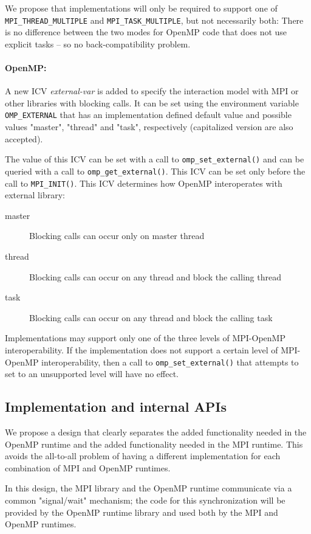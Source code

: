 We propose that implementations will only be required to support one of 
\texttt{MPI\_THREAD\_MULTIPLE} and \texttt{MPI\_TASK\_MULTIPLE}, but not 
necessarily both: There is no difference between the two modes for OpenMP code 
that does not use explicit tasks -- so no back-compatibility problem. 


\paragraph{OpenMP:}
A new ICV \emph{external-var} is added to specify the interaction model with 
MPI or other libraries with blocking calls.
It can be set using the environment variable \texttt{OMP\_EXTERNAL} that has 
an implementation defined default 
 value and possible values  "master", 
"thread" and "task", respectively (capitalized version are 
also accepted).

The value of this ICV can be set with a call to \texttt{omp\_set\_external()} 
and 
can 
be queried with a call to \texttt{omp\_get\_external()}. This ICV can be 
set 
only before the call to \texttt{MPI\_INIT()}. This ICV determines how OpenMP 
interoperates with external library: 
\begin{description}
	\item[master] Blocking calls can occur only on master thread
	\item[thread] Blocking calls can occur on any thread and block the calling 
	thread
	\item[task] Blocking calls can occur on any thread and block the calling 
	task
\end{description}

Implementations may support only one of the three levels of MPI-OpenMP 
interoperability. If the implementation does not support a certain level of 
MPI-OpenMP interoperability, then a call to \texttt{omp\_set\_external()} that 
attempts to set to an unsupported level will have no effect.

\subsection{Implementation and internal APIs}
We propose a design that clearly separates the added functionality needed in 
the OpenMP runtime and the added functionality needed in the MPI runtime. This 
avoids the all-to-all problem of having a different implementation for each 
combination of MPI and OpenMP runtimes. 

In this design, the MPI library and the OpenMP runtime communicate via a 
common "signal/wait" mechanism; the code for this synchronization will be 
provided by the OpenMP runtime library and used both by the MPI and OpenMP 
runtimes.

